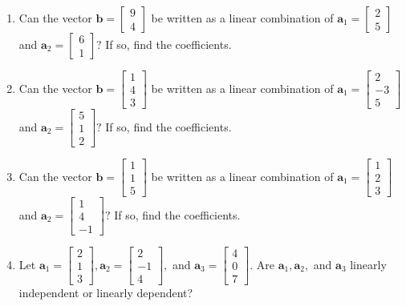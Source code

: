 \documentclass[
]{book}
\theoremstyle{definition}
\theoremstyle{definition}
\theoremstyle{definition}
\theoremstyle{definition}
\theoremstyle{remark}
\begin{document}
\begin{enumerate}
\item
  Can the vector \(\mathbf{b}=\begin{bmatrix}9\\4\end{bmatrix}\) be written as a linear combination of \(\mathbf{a}_1=\begin{bmatrix}2\\5\end{bmatrix}\) and \(\mathbf{a}_2=\begin{bmatrix}6\\1\end{bmatrix}?\) If so, find the coefficients.
\item
  Can the vector \(\mathbf{b}=\begin{bmatrix}1\\4\\3\end{bmatrix}\) be written as a linear combination of \(\mathbf{a}_1=\begin{bmatrix}2\\-3\\5\end{bmatrix}\) and \(\mathbf{a}_2=\begin{bmatrix}5\\1\\2\end{bmatrix}?\) If so, find the coefficients.
\item
  Can the vector \(\mathbf{b}=\begin{bmatrix}1\\1\\5\end{bmatrix}\) be written as a linear combination of \(\mathbf{a}_1=\begin{bmatrix}1\\2\\3\end{bmatrix}\) and \(\mathbf{a}_2=\begin{bmatrix}1\\4\\-1\end{bmatrix}?\) If so, find the coefficients.
\item
  Let
  \(\mathbf{a}_1=\begin{bmatrix}2\\1\\3\end{bmatrix},\mathbf{a}_2=\begin{bmatrix}2\\-1\\4\end{bmatrix},\) and \(\mathbf{a}_3=\begin{bmatrix} 4\\0\\7\end{bmatrix}.\) Are \(\mathbf{a}_1,\mathbf{a}_2,\) and \(\mathbf{a}_3\) linearly independent or linearly dependent?

\end{enumerate}
\end{document}
